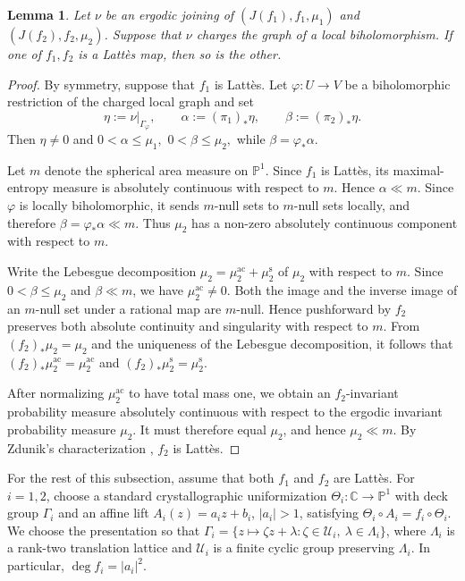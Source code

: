 \documentclass[11pt]{amsart}
\numberwithin{equation}{section}
\theoremstyle{plain}
\newtheorem{lem}[thm]{Lemma}
\theoremstyle{definition}
\theoremstyle{remark}
\begin{document}
\begin{lem}
\label{lem:lattes-propagation}
Let $\nu$ be an ergodic joining of
$(J(f_1),f_1,\mu_1)$ and $(J(f_2),f_2,\mu_2)$. Suppose that $\nu$
charges the graph of a local biholomorphism. If one of $f_1,f_2$ is a Latt\`es map, then so is the other.
\end{lem}

\begin{proof}
By symmetry, suppose that $f_1$ is Latt\`es. Let
$\varphi\colon U\to V$ be a biholomorphic restriction of the
charged local graph and set
$$
\eta:=\nu|_{\Gamma_\varphi},
\qquad
\alpha:=(\pi_1)_*\eta,
\qquad
\beta:=(\pi_2)_*\eta.
$$
Then $\eta\neq0$ and
$
0<\alpha\leq\mu_1,
$
$
0<\beta\leq\mu_2,
$
while
$
\beta=\varphi_*\alpha.
$

Let $m$ denote the spherical area
measure
on $\mathbb P^1$. Since $f_1$ is
Latt\`es, its maximal-entropy measure is absolutely continuous with
respect to $m$.
Hence $\alpha\ll m$. Since $\varphi$ is locally
biholomorphic, it sends $m$-null sets to $m$-null sets locally, and
therefore
$
\beta=\varphi_*\alpha\ll m.
$
Thus $\mu_2$ has a non-zero absolutely continuous component with
respect to $m$.

Write the Lebesgue decomposition
$\mu_2=\mu_2^{\mathrm{ac}}+\mu_2^{\mathrm{s}}$ 
of $\mu_2$
with respect to $m$. Since
$0<\beta\le\mu_2$ and $\beta\ll m$, we have
$\mu_2^{\mathrm{ac}}\ne0$.
Both the image and the inverse image of an $m$-null set under a
rational map are $m$-null. Hence pushforward by $f_2$ preserves both
absolute continuity and singularity with respect to $m$. From
$(f_2)_*\mu_2=\mu_2$ and 
the uniqueness of the Lebesgue decomposition,
it follows that $(f_2)_*\mu_2^{\mathrm{ac}}=\mu_2^{\mathrm{ac}}$
and $(f_2)_*\mu_2^{\mathrm{s}}=\mu_2^{\mathrm{s}}$.

After normalizing $\mu_2^{\mathrm{ac}}$ to have total mass one, we
obtain an $f_2$-invariant probability measure absolutely continuous
with respect to the ergodic invariant probability measure $\mu_2$.
It must therefore equal $\mu_2$, and hence $\mu_2\ll m$. By Zdunik's
characterization \cite{Zdunik90}, $f_2$ is Lattès.
\end{proof}

For the rest of this subsection, assume that both $f_1$ and $f_2$ are
Latt\`es. For $i=1,2$, choose a standard crystallographic
uniformization $\Theta_i\colon\mathbb C\to\mathbb P^1$ with deck
group $\Gamma_i$ and an affine lift
$A_i(z)=a_i z+b_i$, $|a_i|>1$, satisfying
$\Theta_i\circ A_i=f_i\circ\Theta_i$. We choose the presentation so
that
$\Gamma_i=\{z\mapsto\zeta z+\lambda:
\zeta\in\mathcal U_i,\ \lambda\in\Lambda_i\}$, where
$\Lambda_i$ is a rank-two translation lattice and
$\mathcal U_i$ is a finite cyclic group preserving $\Lambda_i$. In particular, $\deg f_i=|a_i|^2$.
\end{document}
